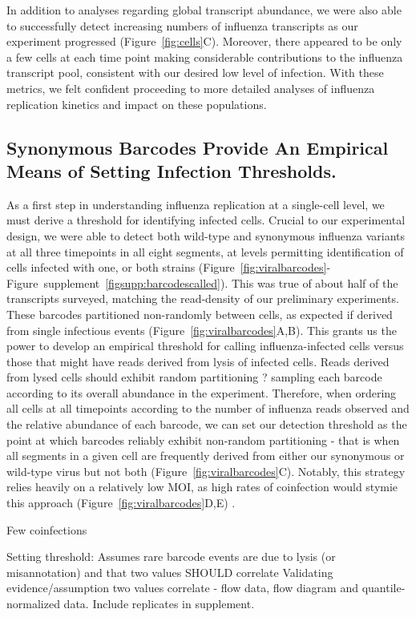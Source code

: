 \documentclass[9pt,lineno]{elife}
\begin{document}
In addition to analyses regarding global transcript abundance, we were also able to successfully detect increasing numbers of influenza transcripts as our experiment progressed (Figure~\ref{fig:cells}C). 
Moreover, there appeared to be only a few cells at each time point making considerable contributions to the influenza transcript pool, consistent with our desired low level of infection. 
With these metrics, we felt confident proceeding to more detailed analyses of influenza replication kinetics and impact on these populations.

\subsection{Synonymous Barcodes Provide An Empirical Means of Setting Infection Thresholds.}
As a first step in understanding influenza replication at a single-cell level, we must derive a threshold for identifying infected cells. 
Crucial to our experimental design, we were able to detect both wild-type and synonymous influenza variants at all three timepoints in all eight segments, at levels permitting identification of cells infected with one, or both strains (Figure~\ref{fig:viralbarcodes}-Figure~supplement~\ref{figsupp:barcodescalled}). 
This was true of about half of the transcripts surveyed, matching the read-density of our preliminary experiments. 
These barcodes partitioned non-randomly between cells, as expected if derived from single infectious events (Figure~\ref{fig:viralbarcodes}A,B). 
This grants us the power to develop an empirical threshold for calling influenza-infected cells versus those that might have reads derived from lysis of infected cells. 
Reads derived from lysed cells should exhibit random partitioning ? sampling each barcode according to its overall abundance in the experiment. 
Therefore, when ordering all cells at all timepoints according to the number of influenza reads observed and the relative abundance of each barcode, we can set our detection threshold as the point at which barcodes reliably exhibit non-random partitioning - that is when all segments in a given cell are frequently derived from either our synonymous or wild-type virus but not both (Figure~\ref{fig:viralbarcodes}C). 
Notably, this strategy relies heavily on a relatively low MOI, as high rates of coinfection would stymie this approach (Figure~\ref{fig:viralbarcodes}D,E) . 

Few coinfections

Setting threshold: Assumes rare barcode events are due to lysis (or misannotation)  and that two values SHOULD correlate
Validating evidence/assumption two values correlate - flow data, flow diagram and quantile-normalized data. Include replicates in supplement.
\end{document}
